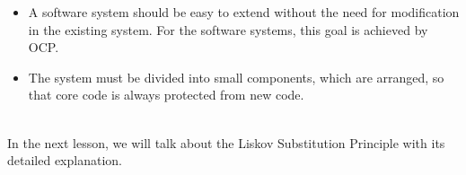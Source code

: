 \begin{itemize}
\item
\protect{}\label{Sfkvh9NJtgdZ1jlZgBmyO}
A software system should be easy to extend without the need for modification in the existing system. For the software systems, this goal is achieved by OCP.
\item
\protect{}\label{EXiw0J2JR5LOqEEm8fb2K}
The system must be divided into small components, which are arranged, so that core code is always protected from new code.
\end{itemize}
\\
In the next lesson, we will talk about the Liskov Substitution Principle with its detailed explanation.


